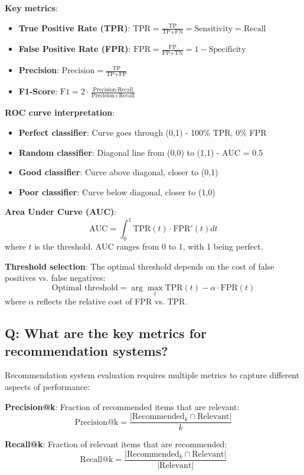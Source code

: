 \textbf{Key metrics}:
\begin{itemize}
	\item \textbf{True Positive Rate (TPR)}: \(\text{TPR} = \frac{\text{TP}}{\text{TP} + \text{FN}} = \text{Sensitivity} = \text{Recall}\)
	\item \textbf{False Positive Rate (FPR)}: \(\text{FPR} = \frac{\text{FP}}{\text{FP} + \text{TN}} = 1 - \text{Specificity}\)
	\item \textbf{Precision}: \(\text{Precision} = \frac{\text{TP}}{\text{TP} + \text{FP}}\)
	\item \textbf{F1-Score}: \(\text{F1} = 2 \cdot \frac{\text{Precision} \cdot \text{Recall}}{\text{Precision} + \text{Recall}}\)
\end{itemize}

\textbf{ROC curve interpretation}:
\begin{itemize}
	\item \textbf{Perfect classifier}: Curve goes through (0,1) - 100\% TPR, 0\% FPR
	\item \textbf{Random classifier}: Diagonal line from (0,0) to (1,1) - AUC = 0.5
	\item \textbf{Good classifier}: Curve above diagonal, closer to (0,1)
	\item \textbf{Poor classifier}: Curve below diagonal, closer to (1,0)
\end{itemize}

\textbf{Area Under Curve (AUC)}:
\[
\text{AUC} = \int_0^1 \text{TPR}(t) \cdot \text{FPR}'(t) dt
\]
where \(t\) is the threshold. AUC ranges from 0 to 1, with 1 being perfect.

\textbf{Threshold selection}:
The optimal threshold depends on the cost of false positives vs. false negatives:
\[
\text{Optimal threshold} = \arg\max_t \text{TPR}(t) - \alpha \cdot \text{FPR}(t)
\]
where \(\alpha\) reflects the relative cost of FPR vs. TPR.

\subsection*{Q: What are the key metrics for recommendation systems?}
Recommendation system evaluation requires multiple metrics to capture different aspects of performance:

\textbf{Precision@k}: Fraction of recommended items that are relevant:
\[
\text{Precision@k} = \frac{|\text{Recommended}_k \cap \text{Relevant}|}{k}
\]

\textbf{Recall@k}: Fraction of relevant items that are recommended:
\[
\text{Recall@k} = \frac{|\text{Recommended}_k \cap \text{Relevant}|}{|\text{Relevant}|}
\]

